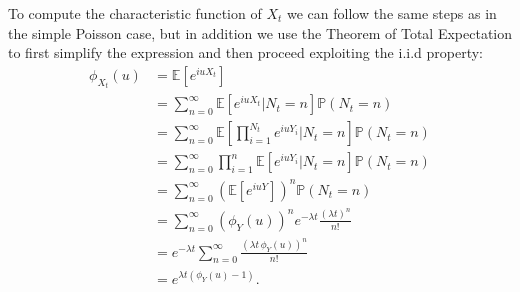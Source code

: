 \bigskip
To compute the characteristic function of $X_t$ we can follow the same steps as in the simple Poisson case, but in addition we use the Theorem of Total Expectation to first simplify the expression and then proceed exploiting the i.i.d property:
\begin{equation*} 
	\begin{split}
	\phi_{X_t}(u) & = \mathbb{E}[e^{iu X_t}]\\
	&= \sum_{n=0}^{\infty} \mathbb{E}[e^{iu X_t}| N_t = n] \mathbb{P}( N_t = n)\\
	&= \sum_{n=0}^{\infty} \mathbb{E}[\prod_{i=1}^{N_t}e^{iu Y_i}| N_t = n] \mathbb{P}( N_t = n)\\
	& = \sum_{n=0}^{\infty} \prod_{i=1}^{n}\mathbb{E}[e^{iu Y_i}| N_t = n] \mathbb{P}( N_t = n)\\
	&= \sum_{n=0}^{\infty} (\mathbb{E}[e^{iu Y}])^n \mathbb{P}( N_t = n)\\
	&= \sum_{n=0}^{\infty}(\phi_Y(u))^n e^{-\lambda t}\frac{(\lambda t)^n}{n!}\\
	&= e^{-\lambda t}\sum_{n=0}^{\infty}\frac{(\lambda t \, \phi_Y(u))^n}{n!}\\
	&=e^{\lambda t (\phi_Y(u)-1)}.
	\end{split}
\end{equation*}
